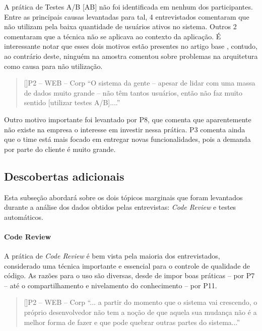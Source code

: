 A prática de Testes A/B [AB] não foi identificada em nenhum dos participantes. Entre as principais causas levantadas para tal, 4 entrevistados comentaram que não utilizam pela baixa quantidade de usuários ativos no sistema. Outros 2 comentaram que a técnica não se aplicava ao contexto da aplicação. É interessante notar que esses dois motivos estão presentes no artigo base \cite{empiricalStudy2016}, contudo, ao contrário deste, ninguém na amostra comentou sobre problemas na arquitetura como causa para não utilização.


\begin{quotation}[]{P2 -- WEB -- Corp}
    ``O sistema da gente -- apesar de lidar com uma massa de dados muito grande -- não têm tantos usuários, então não faz muito sentido [utilizar testes A/B]....''
\end{quotation}

Outro motivo importante foi levantado por P8, que comenta que aparentemente não existe na empresa o interesse em investir nessa prática. P3 comenta ainda que o time está mais focado em entregar novas funcionalidades, pois a demanda por parte do cliente é muito grande.

\subsection{Descobertas adicionais}

Esta subseção abordará sobre os dois tópicos marginais que foram levantados durante a análise dos dados obtidos pelas entrevistas: \emph{Code Review} e testes automáticos.

\paragraph{Code Review}

A prática de \emph{Code Review} \cite{codeReview} é bem vista pela maioria dos entrevistados, considerado uma técnica importante e essencial para o controle de qualidade de código. As razões para o uso são diversas, desde de impor boas práticas -- por P7 -- até o compartilhamento e nivelamento do conhecimento -- por P11.

\begin{quotation}[]{P2 -- WEB -- Corp}
    ``... a partir do momento que o sistema vai crescendo, o próprio desenvolvedor não tem a noção de que aquela sua mudança não é a melhor forma de fazer e que pode quebrar outras partes do sistema...''
\end{quotation}

